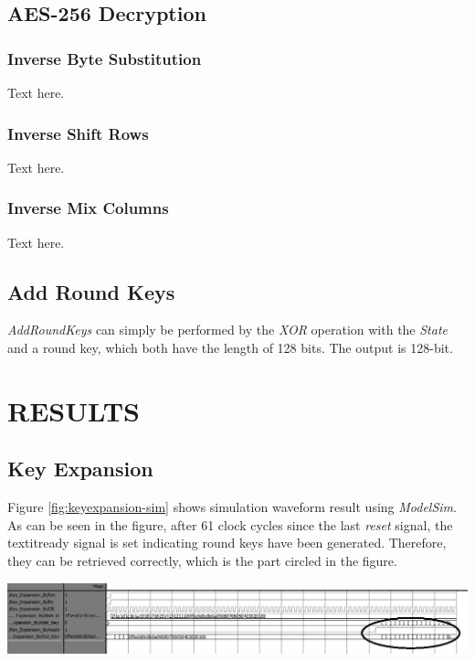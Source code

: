 \documentclass[a4paper, 10pt]{article}
\newenvironment{Figure}
    {\par\medskip\noindent\minipage{\linewidth}}
    {\endminipage\par\medskip}
\begin{document}
\begin{multicols}{2}
            \subsection{AES-256 Decryption}

            \subsubsection{Inverse Byte Substitution}
        
            Text here.

            \subsubsection{Inverse Shift Rows}

            Text here.

            \subsubsection{Inverse Mix Columns}

            Text here.

            \subsection{Add Round Keys}

            \textit{AddRoundKeys} can simply be performed by the \textit{XOR} operation with the \textit{State} and a round key, which both have the length of 128 bits. The output is 128-bit.

        \section{RESULTS}

        \subsection{Key Expansion}

        Figure \ref{fig:keyexpansion-sim} shows simulation waveform result using \textit{ModelSim}. As can be seen in the figure, after 61 clock cycles since the last \textit{reset} signal, the textit{ready} signal is set indicating round keys have been generated. Therefore, they can be retrieved correctly, which is the part circled in the figure.

            \begin{Figure}
                \centering
                \includegraphics[width=\linewidth]{KeyExpansion-GetRoundKeysStage-edited.png}
                \label{fig:keyexpansion-sim}
            \end{Figure}


\end{multicols}
\end{document}
